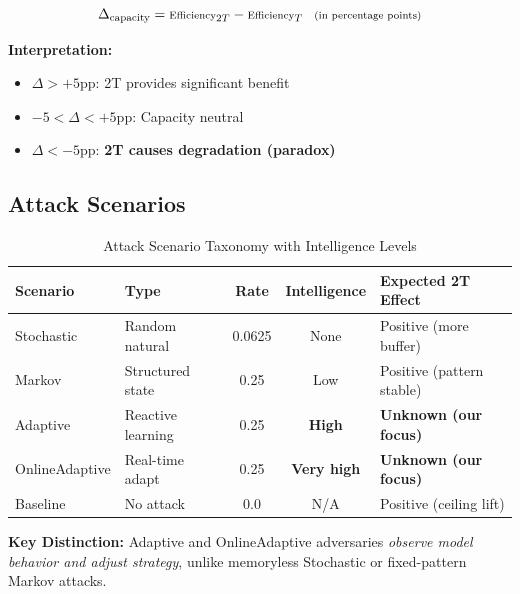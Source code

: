 \documentclass[11pt,a4paper]{article}
\newcommand{\critical}[1]{\textcolor{criticalcolor}{\textbf{#1}}}
\begin{document}
\vspace{-0.4cm}
\begin{equation}
\scriptsize
\Delta_{\text{capacity}} = \text{Efficiency}_{2T} - \text{Efficiency}_{T} \quad \text{(in percentage points)}
\end{equation}

\textbf{Interpretation:}
\begin{itemize}
    \vspace{-0.2cm}
    \item $\Delta > +5$pp: 2T provides significant benefit
    \vspace{-0.2cm}
    \item $-5 < \Delta < +5$pp: Capacity neutral
    \vspace{-0.2cm}
    \item $\Delta < -5$pp: \critical{2T causes degradation (paradox)}
\end{itemize}


\subsection{Attack Scenarios}

\vspace{-0.4cm}
\begin{table}[h]
\scriptsize
\centering
\begin{tabular}{llccl}
\toprule
\textbf{Scenario} & \textbf{Type} & \textbf{Rate} & \textbf{Intelligence} & \textbf{Expected 2T Effect} \\
\midrule
Stochastic & Random natural & 0.0625 & None & Positive (more buffer) \\
Markov & Structured state & 0.25 & Low & Positive (pattern stable) \\
Adaptive & Reactive learning & 0.25 & \critical{High} & \critical{Unknown (our focus)} \\
OnlineAdaptive & Real-time adapt & 0.25 & \critical{Very high} & \critical{Unknown (our focus)} \\
Baseline & No attack & 0.0 & N/A & Positive (ceiling lift) \\
\bottomrule
\end{tabular}
\vspace{-0.2cm}
\caption{Attack Scenario Taxonomy with Intelligence Levels}
\end{table}

\vspace{-0.2cm}
\textbf{Key Distinction:} Adaptive and OnlineAdaptive adversaries \textit{observe model behavior and adjust strategy}, unlike memoryless Stochastic or fixed-pattern Markov attacks.
\end{document}
